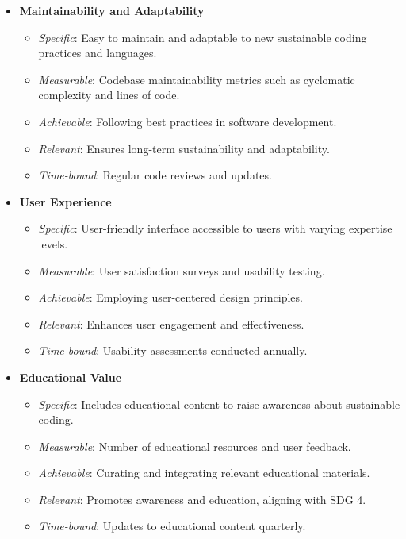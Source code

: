 \documentclass[conference,compsoc]{IEEEtran}
\begin{document}
\begin{itemize}
	\item \textbf{Maintainability and Adaptability}
	      \begin{itemize}
		      \item \textit{Specific}: Easy to maintain and adaptable to new sustainable coding practices and languages.
		      \item \textit{Measurable}: Codebase maintainability metrics such as cyclomatic complexity and lines of code.
		      \item \textit{Achievable}: Following best practices in software development.
		      \item \textit{Relevant}: Ensures long-term sustainability and adaptability.
		      \item \textit{Time-bound}: Regular code reviews and updates.
	      \end{itemize}

	\item \textbf{User Experience}
	      \begin{itemize}
		      \item \textit{Specific}: User-friendly interface accessible to users with varying expertise levels.
		      \item \textit{Measurable}: User satisfaction surveys and usability testing.
		      \item \textit{Achievable}: Employing user-centered design principles.
		      \item \textit{Relevant}: Enhances user engagement and effectiveness.
		      \item \textit{Time-bound}: Usability assessments conducted annually.
	      \end{itemize}

	\item \textbf{Educational Value}
	      \begin{itemize}
		      \item \textit{Specific}: Includes educational content to raise awareness about sustainable coding.
		      \item \textit{Measurable}: Number of educational resources and user feedback.
		      \item \textit{Achievable}: Curating and integrating relevant educational materials.
		      \item \textit{Relevant}: Promotes awareness and education, aligning with SDG 4.
		      \item \textit{Time-bound}: Updates to educational content quarterly.
	      \end{itemize}


\end{itemize}
\end{document}
